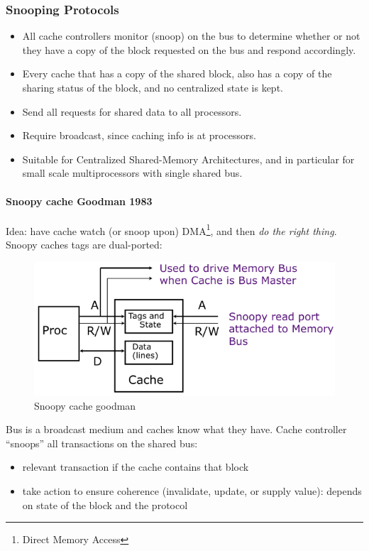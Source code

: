 \subsubsection{Snooping Protocols}
\begin{itemize}
    \item[\textrightarrow] All cache controllers monitor (snoop) on the bus to
    determine whether or not they have a copy of the block
    requested on the bus and respond accordingly.
    \item[\textrightarrow] Every cache that has a copy of the shared block, also
    has a copy of the sharing status of the block, and no
    centralized state is kept.
    \item[\textrightarrow]
    Send all requests for shared data to all processors.
    \item [\textrightarrow] Require broadcast, since caching info is at processors.
    \item [\textrightarrow] Suitable for Centralized Shared-Memory Architectures,
    and in particular for small scale multiprocessors with
    single shared bus.
\end{itemize}

\paragraph{Snoopy cache Goodman 1983}
Idea: have cache watch (or snoop upon) DMA\footnote{Direct Memory Access}, and then \textit{do the right thing}.
Snoopy caches tags are dual-ported:

\begin{figure}[h]
    \centering
    \includegraphics[scale = 0.4]{images/snoopy-cache-goodman}
    \caption{Snoopy cache goodman}
    \label{fig:snoopy-cache-goodman}
\end{figure}

Bus is a broadcast medium and caches know what
they have.
Cache controller “snoops” all transactions on the
shared bus:
\begin{itemize}
    \item relevant transaction if the cache contains that block
    \item take action to ensure coherence (\textrightarrow invalidate, update, or supply value):
    \subitem depends on state of the block and the protocol
\end{itemize}

